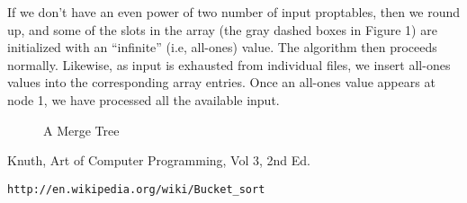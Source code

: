 \documentclass[11pt]{article}
\begin{document}
If we don't have an even power of two number of input proptables, then
we round up, and some of the slots in the array (the gray dashed boxes
in Figure 1) are initialized with an ``infinite'' (i.e, all-ones)
value.  The algorithm then proceeds normally.  Likewise, as input is
exhausted from individual files, we insert all-ones values into the
corresponding array entries.  Once an all-ones value appears at node
1, we have processed all the available input.


\begin{figure}
\begin{center}
\end{center}
\caption{A Merge Tree}
\end{figure}

\begin{thebibliography}{99}

 Knuth, Art of Computer Programming, Vol 3, 2nd Ed.

 {\tt http://en.wikipedia.org/wiki/Bucket\_sort}

\end{thebibliography}
\end{document}

